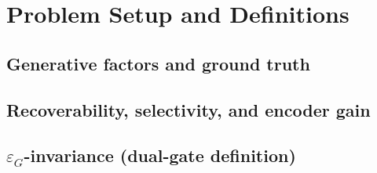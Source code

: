 \documentclass[11pt]{article}
\newcommand{\epsG}{\varepsilon_G}
\begin{document}
\section{Problem Setup and Definitions}
\label{sec:defs}

\subsection{Generative factors and ground truth}

\subsection{Recoverability, selectivity, and encoder gain}

\subsection{$\epsG$-invariance (dual-gate definition)}
%
\end{document}
